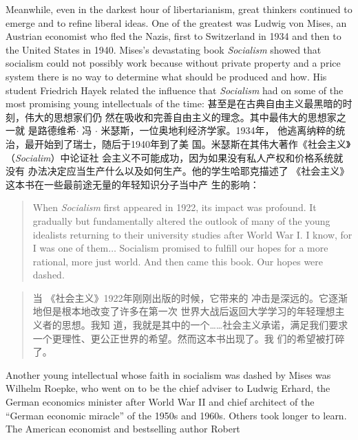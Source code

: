 \begin{paracol}{2}
Meanwhile, even in the darkest hour of libertarianism, great
thinkers continued to emerge and to refine liberal ideas. One of
the greatest was Ludwig von Mises, an Austrian economist who
fled the Nazis, first to Switzerland in 1934 and then to the
United States in 1940. Mises's devastating book \textit{Socialism}
showed that socialism could not possibly work because without
private property and a price system there is no way to determine what should be produced and how. His student Friedrich
Hayek related the influence that \textit{Socialism} had on some of the
most promising young intellectuals of the time:
\switchcolumn
甚至是在古典自由主义最黑暗的时刻，伟大的思想家们仍
然在吸收和完善自由主义的理念。其中最伟大的思想家之一就
是路德维希$\cdot$ 冯 $\cdot$ 米瑟斯，一位奥地利经济学家。1934年，
他逃离纳粹的统治，最开始到了瑞士，随后于1940年到了美
国。米瑟斯在其伟大著作《社会主义》（\textit{Socialim}）中论证社
会主义不可能成功，因为如果没有私人产权和价格系统就没有
办法决定应当生产什么以及如何生产。他的学生哈耶克描述了
《社会主义》这本书在一些最前途无量的年轻知识分子当中产
生的影响：
\switchcolumn*
\begin{quote}
When \textit{Socialism} first appeared in 1922, its impact was profound.
It gradually but fundamentally altered the outlook of many of
the young idealists returning to their university studies after
World War I. I know, for I was one of them$\ldots$ Socialism
promised to fulfill our hopes for a more rational, more just world.
And then came this book. Our hopes were dashed.
\end{quote}
\switchcolumn
\begin{quote}
当 《社会主义》1922年刚刚出版的时候，它带来的
冲击是深远的。它逐渐地但是根本地改变了许多在第一次
世界大战后返回大学学习的年轻理想主义者的思想。我知
道，我就是其中的一个……社会主义承诺，满足我们要求
一个更理性、更公正世界的希望。然而这本书出现了。我
们的希望被打碎了。
\end{quote}
\switchcolumn*
Another young intellectual whose faith in socialism was
dashed by Mises was Wilhelm Roepke, who went on to be the
chief adviser to Ludwig Erhard, the German economics minister after World War II and chief architect of the ``German economic miracle'' of the 1950s and 1960s. Others took longer to
learn. The American economist and bestselling author Robert

\end{paracol}
